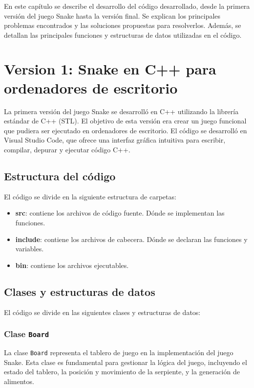 En este capítulo se describe el desarrollo del código desarrollado, desde la primera versión del juego Snake hasta la versión final. Se explican los principales problemas encontrados y las soluciones propuestas para resolverlos. Además, se detallan las principales funciones y estructuras de datos utilizadas en el código.

\section{Version 1: Snake en C++ para ordenadores de escritorio}

La primera versión del juego Snake se desarrolló en C++ utilizando la librería estándar de C++ (STL). El objetivo de esta versión era crear un juego funcional que pudiera ser ejecutado en ordenadores de escritorio. El código se desarrolló en Visual Studio Code, que ofrece una interfaz gráfica intuitiva para escribir, compilar, depurar y ejecutar código C++.

\subsection{Estructura del código}

El código se divide en la siguiente estructura de carpetas:

\begin{itemize}
\item \textbf{src}: contiene los archivos de código fuente. Dónde se implementan las funciones.
\item \textbf{include}: contiene los archivos de cabecera. Dónde se declaran las funciones y variables.
\item \textbf{bin}: contiene los archivos ejecutables.
\end{itemize}


\subsection{Clases y estructuras de datos}

El código se divide en las siguientes clases y estructuras de datos:

\subsubsection{Clase \texttt{Board}}

La clase \texttt{Board} representa el tablero de juego en la implementación del juego Snake. Esta clase es fundamental para gestionar la lógica del juego, incluyendo el estado del tablero, la posición y movimiento de la serpiente, y la generación de alimentos.


